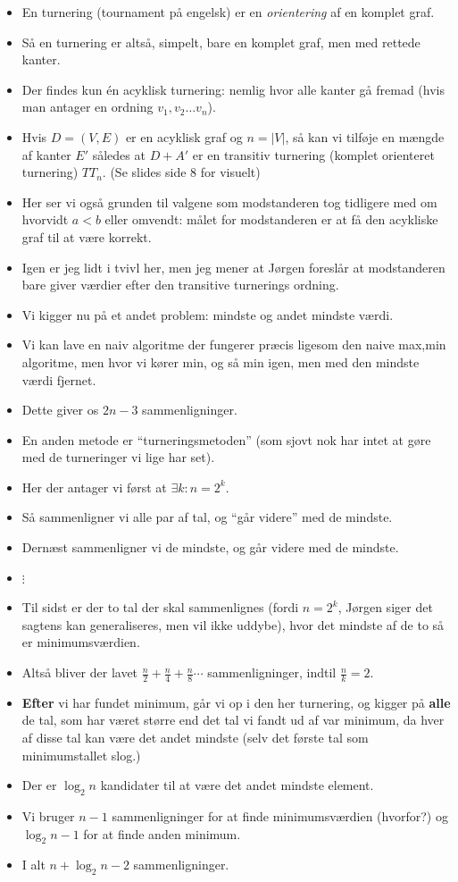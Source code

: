 \begin{frame}[allowframebreaks]
\begin{itemize}
   \item En turnering (tournament på engelsk) er en \textit{orientering} af en komplet graf.
   \item Så en turnering er altså, simpelt, bare en komplet graf, men med rettede kanter.
   \item Der findes kun én acyklisk turnering: nemlig hvor alle kanter gå fremad (hvis man antager en ordning $v_{1}, v_{2} \ldots v_{n}$).
   \item Hvis $D = (V,E)$ er en acyklisk graf og $n = |V|$, så kan vi tilføje en mængde af kanter $E'$ således at $D + A'$ er en transitiv turnering (komplet orienteret turnering) $TT_{n}$. (Se slides side 8 for visuelt)
   \item Her ser vi også grunden til valgene som modstanderen tog tidligere med om hvorvidt $a < b$ eller omvendt: målet for modstanderen er at få den acykliske graf til at være korrekt.
   \item Igen er jeg lidt i tvivl her, men jeg mener at Jørgen foreslår at modstanderen bare giver værdier efter den transitive turnerings ordning.
   \item Vi kigger nu på et andet problem: mindste og andet mindste værdi.
   \item Vi kan lave en naiv algoritme der fungerer præcis ligesom den naive max,min algoritme, men hvor vi kører min, og så min igen, men med den mindste værdi fjernet.
   \item Dette giver os $2n-3$ sammenligninger.
   \item En anden metode er ``turneringsmetoden'' (som sjovt nok har intet at gøre med de turneringer vi lige har set).
   \item Her der antager vi først at $\exists k : n = 2^{k}$.
   \item Så sammenligner vi alle par af tal, og ``går videre'' med de mindste.
   \item Dernæst sammenligner vi de mindste, og går videre med de mindste.
   \item $\vdots$
   \item Til sidst er der to tal der skal sammenlignes (fordi $n = 2^{k}$, Jørgen siger det sagtens kan generaliseres, men vil ikke uddybe), hvor det mindste af de to så er minimumsværdien.
   \item Altså bliver der lavet $\frac{n}{2} + \frac{n}{4} + \frac{n}{8} \cdots$ sammenligninger, indtil $\frac{n}{k} = 2$.
   \item \textbf{Efter} vi har fundet minimum, går vi op i den her turnering, og kigger på \textbf{alle} de tal, som har været større end det tal vi fandt ud af var minimum, da hver af disse tal kan være det andet mindste (selv det første tal som minimumstallet slog.)
   \item Der er $\log_{2}n$ kandidater til at være det andet mindste element.
   \item Vi bruger $n-1$ sammenligninger for at finde minimumsværdien (hvorfor?) og $\log_{2}n-1$ for at finde anden minimum.
   \item I alt $n+\log_{2}n-2$ sammenligninger.
 \end{itemize}
\end{frame}

